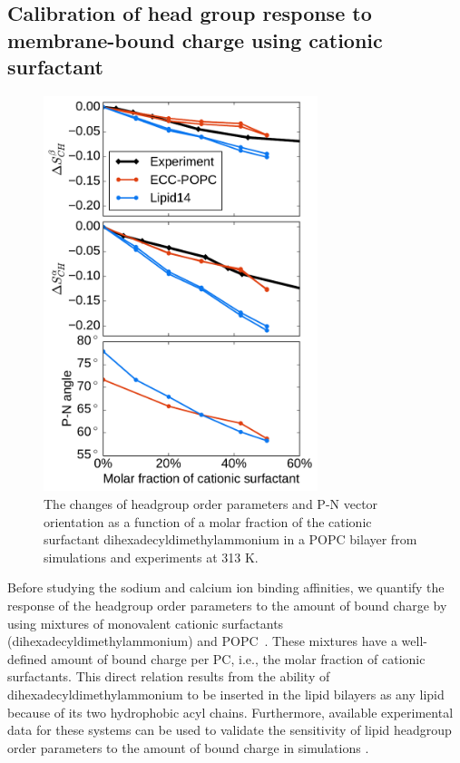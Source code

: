 \documentclass[aip,jcp,twocolumn]{revtex4}
\begin{document}

\subsection{Calibration of head group response to membrane-bound charge using cationic surfactant}\label{section:boundCHARGE}

\begin{figure}[tb!]
  \centering
  \includegraphics[width=8.0cm]{../Fig/ipython_nb/PN_angle_OrdPars-A-B_L14-ECCL17_q80_sig89_surf.pdf}
  \caption{\label{OrderParameterCHANGESsurf}
    The changes of headgroup order parameters and P-N vector orientation as a function of
    a molar fraction of the cationic surfactant dihexadecyldimethylammonium in a POPC bilayer
    from simulations and experiments \cite{scherer89} at 313 K.
  }
\end{figure}

Before studying the sodium and calcium ion binding affinities, we quantify the response of the headgroup order parameters to the amount of bound charge by using mixtures of monovalent cationic surfactants (dihexadecyldimethylammonium) and POPC~\cite{scherer89}. These mixtures have a well-defined amount of bound charge per PC, i.e., the molar fraction of cationic surfactants. This direct relation results from the ability of dihexadecyldimethylammonium to be inserted in the lipid bilayers as any lipid because of its two hydrophobic acyl chains. Furthermore, available experimental data for these systems can be used to validate the sensitivity of lipid headgroup order parameters to the amount of bound charge in simulations \cite{scherer89}.
\end{document}
